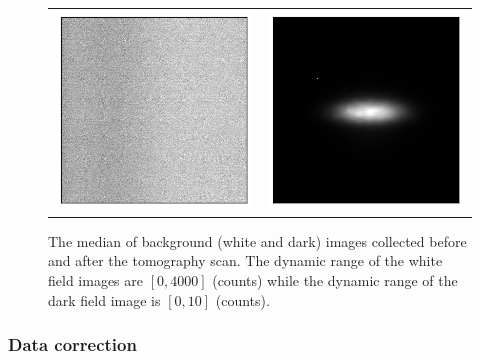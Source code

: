 \documentclass[12pt]{scrartcl}
\newcommand{\myscale}{1}
\begin{document}
\begin{figure}
\begin{tabular}{cc}
	\includegraphics[scale=\myscale]{darkField_pst}
& \includegraphics[scale=\myscale]{whiteField_pst}
\end{tabular}
\caption{
The median of background (white and dark) images collected before and after the tomography scan.
The dynamic range of the white field images are $[0,4000]$ (counts) while the dynamic range of the dark field image is $[0,10]$ (counts).
}
\end{figure}


\subsubsection{Data correction}\label{sec: data correction}
\end{document}
